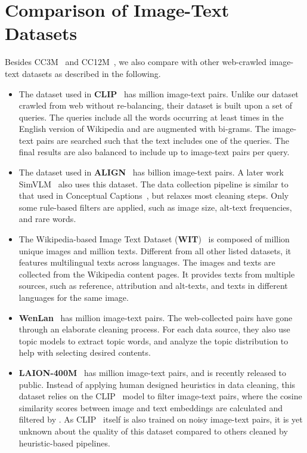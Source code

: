 \section{Comparison of Image-Text Datasets}
Besides CC3M~\cite{sharma2018conceptual} and CC12M~\cite{changpinyo2021conceptual}, we also compare with other web-crawled image-text datasets as described in the following.
\begin{itemize}[leftmargin=*]
\item The dataset used in \textbf{CLIP}~\cite{radford2021learning} has  million image-text pairs. Unlike our dataset crawled from web without re-balancing, their dataset is built upon a set of  queries. The queries include all the words occurring at least  times in
the English version of Wikipedia and are augmented with bi-grams. The image-text pairs are searched such that the text includes one of the queries. The final results are also balanced to include up to  image-text pairs per query.

\item The dataset used in \textbf{ALIGN}~\cite{jia2021scaling} has  billion image-text pairs. A later work SimVLM~\cite{wang2021simvlm} also uses this dataset. The data collection pipeline is similar to that used in Conceptual Captions~\cite{sharma2018conceptual,changpinyo2021conceptual}, but relaxes most cleaning steps. Only some rule-based filters are applied, such as image size, alt-text frequencies, and rare words.

\item The Wikipedia-based Image Text Dataset (\textbf{WIT})~\cite{srinivasan2021wit} is composed of  million unique images and  million texts. Different from all other listed datasets, it features multilingual texts across  languages. The images and texts are collected from the Wikipedia content pages. It provides texts from multiple sources, such as reference, attribution and
alt-texts, and texts in different languages for the same image.

\item \textbf{WenLan}~\cite{huo2021wenlan} has  million image-text pairs. The web-collected pairs have gone through an elaborate cleaning process. For each data source, they also use topic
models to extract topic words, and analyze the topic distribution to help with selecting desired contents.

\item \textbf{LAION-400M}~\cite{schuhmann2021laion} has  million image-text pairs, and is recently released to public. Instead of applying human designed heuristics in data cleaning, this dataset relies on the CLIP~\cite{radford2021learning} model to filter image-text pairs, where the cosine similarity scores between image and text embeddings are calculated and filtered by . As CLIP~\cite{radford2021learning} itself is also trained on noisy image-text pairs, it is yet unknown about the quality of this dataset compared to others cleaned by heuristic-based pipelines.

\end{itemize}

